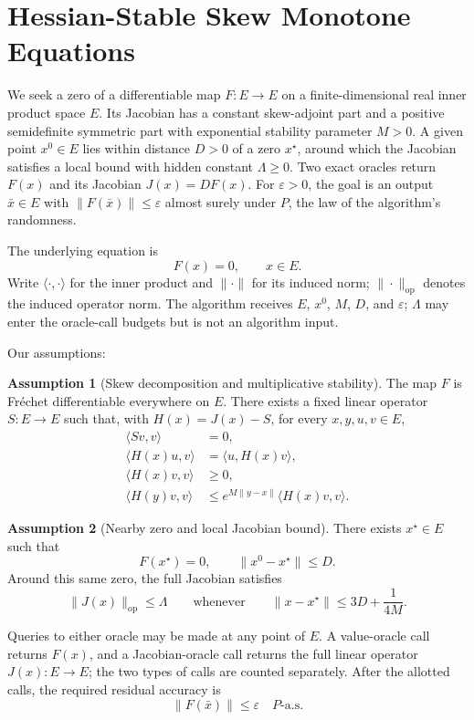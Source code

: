 \documentclass[10pt]{article}
\theoremstyle{definition}
\newtheorem{assumption}{Assumption}
\begin{document}
\section*{Hessian-Stable Skew Monotone Equations}
We seek a zero of a differentiable map $F:E\to E$ on a finite-dimensional real inner product space $E$. Its Jacobian has a constant skew-adjoint part and a positive semidefinite symmetric part with exponential stability parameter $M>0$. A given point $x^0\in E$ lies within distance $D>0$ of a zero $x^\star$, around which the Jacobian satisfies a local bound with hidden constant $\Lambda\geq0$. Two exact oracles return $F(x)$ and its Jacobian $J(x)=DF(x)$. For $\varepsilon>0$, the goal is an output $\bar{x}\in E$ with $\|F(\bar{x})\|\leq\varepsilon$ almost surely under $P$, the law of the algorithm's randomness.

The underlying equation is
\[
F(x)=0,\qquad x\in E.
\]
Write $\langle\cdot,\cdot\rangle$ for the inner product and $\|\cdot\|$ for its induced norm; $\|\cdot\|_{\mathrm{op}}$ denotes the induced operator norm. The algorithm receives $E$, $x^0$, $M$, $D$, and $\varepsilon$; $\Lambda$ may enter the oracle-call budgets but is not an algorithm input.

Our assumptions:
\begin{assumption}[Skew decomposition and multiplicative stability]
The map $F$ is Fr\'echet differentiable everywhere on $E$. There exists a fixed linear operator $S:E\to E$ such that, with $H(x)=J(x)-S$, for every $x,y,u,v\in E$,
\[
\begin{aligned}
\langle Sv,v\rangle&=0,\\
\langle H(x)u,v\rangle&=\langle u,H(x)v\rangle,\\
\langle H(x)v,v\rangle&\geq0,\\
\langle H(y)v,v\rangle
&\leq e^{M\|y-x\|}\langle H(x)v,v\rangle.
\end{aligned}
\]
\end{assumption}

\begin{assumption}[Nearby zero and local Jacobian bound]
There exists $x^\star\in E$ such that
\[
F(x^\star)=0,\qquad \|x^0-x^\star\|\leq D.
\]
Around this same zero, the full Jacobian satisfies
\[
\|J(x)\|_{\mathrm{op}}\leq\Lambda
\qquad\text{whenever}\qquad
\|x-x^\star\|\leq 3D+\frac{1}{4M}.
\]
\end{assumption}

Queries to either oracle may be made at any point of $E$. A value-oracle call returns $F(x)$, and a Jacobian-oracle call returns the full linear operator $J(x):E\to E$; the two types of calls are counted separately. After the allotted calls, the required residual accuracy is
\[
\|F(\bar{x})\|\leq\varepsilon
\quad P\text{-a.s.}
\]
\end{document}
